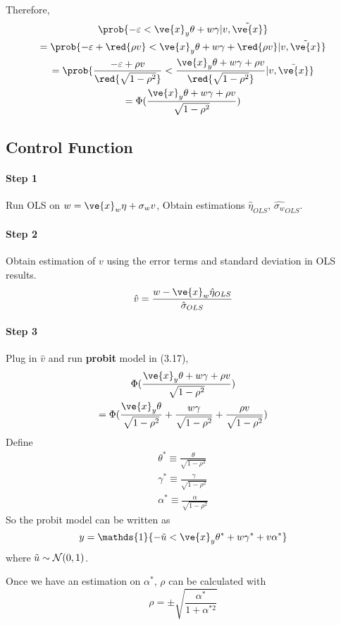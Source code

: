 \documentclass[11pt]{article}
\begin{document}
			\par Therefore,
			\begin{gather}
				\prob{-\varepsilon < \ve{x}_y \theta + w \gamma | v, \tilde{\ve{x}}} \\
				= \prob{-\varepsilon + \red{\rho v} < \ve{x}_y \theta + w \gamma + \red{\rho v}|v, \tilde{\ve{x}}} \\
				= \prob{\frac{-\varepsilon + \rho v}{\red{\sqrt{1 - \rho^2}}} < \frac{\ve{x}_y \theta + w \gamma + \rho v}{\red{\sqrt{1 - \rho^2}}} |v, \tilde{\ve{x}}} \\
				= \Phi(\frac{\ve{x}_y \theta + w \gamma + \rho v}{\sqrt{1 - \rho^2}})
			\end{gather}
			
		\subsection{Control Function}
			\paragraph{Step 1} Run OLS on $w = \ve{x}_w \eta + \sigma_w v$, Obtain estimations $\hat{\eta}_{OLS}$, $\hat{\sigma_w}_{OLS}$.
			\paragraph{Step 2} Obtain estimation of $v$ using the error terms and standard deviation in OLS results.
				\begin{equation}
					\hat{v} = \frac{w - \ve{x}_w \hat{\eta}_{OLS}}{\hat{\sigma}_{OLS}}
				\end{equation}
			\paragraph{Step 3} Plug in $\hat{v}$ and run \textbf{probit} model in (3.17),
				\begin{gather}
					\Phi(\frac{\ve{x}_y \theta + w \gamma + \rho v}{\sqrt{1 - \rho^2}}) \\
					= \Phi(\frac{\ve{x}_y \theta}{\sqrt{1 - \rho^2}} + \frac{w \gamma}{\sqrt{1 - \rho^2}} + \frac{\rho v}{\sqrt{1 - \rho^2}})
				\end{gather}
				Define
				\begin{gather}
					\theta^* \equiv \frac{\theta}{\sqrt{1 - \rho^2}} \\
					\gamma^* \equiv \frac{\gamma}{\sqrt{1 - \rho^2}} \\
					\alpha^* \equiv \frac{\alpha}{\sqrt{1 - \rho^2}}
				\end{gather}
				So the probit model can be written as
				\begin{equation}
					y = \mathds{1} \{-\tilde{u} < \ve{x}_y \theta^* + w \gamma^* + v \alpha^*\}
				\end{equation}
				where $\tilde{u} \sim \mathcal{{N}}(0,1)$.\\
				\par Once we have an estimation on $\alpha^*$, $\rho$ can be calculated with
				\begin{equation}
					\rho = \pm \sqrt{\frac{\alpha^*}{1 + \alpha^{*2}}}
				\end{equation}
\end{document}
